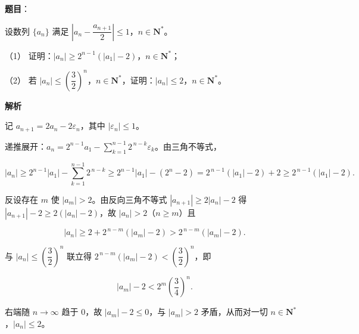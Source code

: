 \begin{answer}

\textbf{题目}：

设数列 \(\{a_{n}\}\) 满足 \(\left|a_{n}-\dfrac{a_{n+1}}{2}\right|\leqslant 1\)，\(n\in\mathbf{N}^{*}\)。

（1） 证明：\(|a_{n}|\geqslant 2^{n-1}(|a_{1}|-2)\)，\(n\in\mathbf{N}^{*}\)；

（2） 若 \(|a_{n}|\leqslant\left(\dfrac{3}{2}\right)^{n}\)，\(n\in\mathbf{N}^{*}\)，证明：\(|a_{n}|\leqslant 2\)，\(n\in\mathbf{N}^{*}\)。

\textbf{解析}

记 \(a_{n+1}=2a_{n}-2\varepsilon_{n}\)，其中 \(|\varepsilon_{n}|\leqslant 1\)。


递推展开：\(a_{n}=2^{n-1}a_{1}-\sum\limits_{k=1}^{n-1}2^{\,n-k}\varepsilon_{k}\)。由三角不等式，

\nopagebreak[4]
\[
|a_{n}|\geqslant 2^{n-1}|a_{1}|-\sum\limits_{k=1}^{n-1}2^{\,n-k}\geqslant 2^{n-1}|a_{1}|-(2^{n}-2)=2^{\,n-1}\left(|a_{1}|-2\right)+2\geqslant 2^{\,n-1}\left(|a_{1}|-2\right).
\]


反设存在 \(m\) 使 \(|a_{m}|>2\)。由反向三角不等式 \(|a_{n+1}|\geqslant 2|a_{n}|-2\) 得 \(|a_{n+1}|-2\geqslant 2\left(|a_{n}|-2\right)\)，故 \(|a_{n}|>2\)（\(n\geqslant m\)）且

\nopagebreak[4]
\[
|a_{n}|\geqslant 2+2^{\,n-m}\left(|a_{m}|-2\right)>2^{\,n-m}\left(|a_{m}|-2\right).
\]

与 \(|a_{n}|\leqslant\left(\dfrac{3}{2}\right)^{n}\) 联立得 \(2^{\,n-m}\left(|a_{m}|-2\right)<\left(\dfrac{3}{2}\right)^{n}\)，即

\nopagebreak[4]
\[
|a_{m}|-2<2^{m}\left(\dfrac{3}{4}\right)^{n}.
\]

右端随 \(n\to\infty\) 趋于 \(0\)，故 \(|a_{m}|-2\leqslant 0\)，与 \(|a_{m}|>2\) 矛盾，从而对一切 \(n\in\mathbf{N}^{*}\)，\(|a_{n}|\leqslant 2\)。



\end{answer}